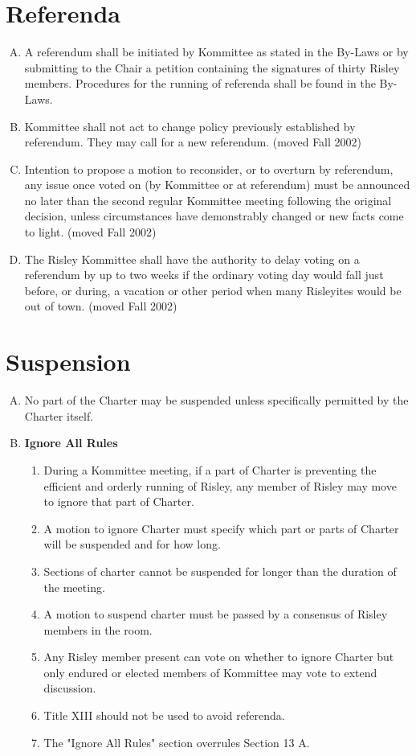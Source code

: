 \documentclass[12pt]{article}
\begin{document}
\section{Referenda}
\begin{enumerate}[A.]
\item A referendum shall be initiated by Kommittee as stated in the By-Laws or by submitting to the Chair a petition containing the signatures of thirty Risley members. Procedures for the running of referenda shall be found in the By-Laws.
\item Kommittee shall not act to change policy previously established by referendum. They may call for a new referendum. (moved Fall 2002)
\item Intention to propose a motion to reconsider, or to overturn by referendum, any issue once voted on (by Kommittee or at referendum) must be announced no later than the second regular Kommittee meeting following the original decision, unless circumstances have demonstrably changed or new facts come to light. (moved Fall 2002)
\item The Risley Kommittee shall have the authority to delay voting on a referendum by up to two weeks if the ordinary voting day would fall just before, or during, a vacation or other period when many Risleyites would be out of town. (moved Fall 2002)
\end{enumerate}
\section{Suspension}
\begin{enumerate}[A.]
\item No part of the Charter may be suspended unless specifically permitted by the Charter itself.
\item \textbf{Ignore All Rules}
\begin{enumerate}[1.]
\item During a Kommittee meeting, if a part of Charter is preventing the efficient and orderly running of Risley, any member of Risley may move to ignore that part of Charter.
\item A motion to ignore Charter must specify which part or parts of Charter will be suspended and for how long.
\item Sections of charter cannot be suspended for longer than the duration of the meeting.
\item A motion to suspend charter must be passed by a consensus of Risley members in the room.
\item Any Risley member present can vote on whether to ignore Charter but only endured or elected members of Kommittee may vote to extend discussion.
\item Title XIII should not be used to avoid referenda.
\item The "Ignore All Rules" section overrules Section 13 A.
\end{enumerate}
\end{enumerate}
\end{document}
